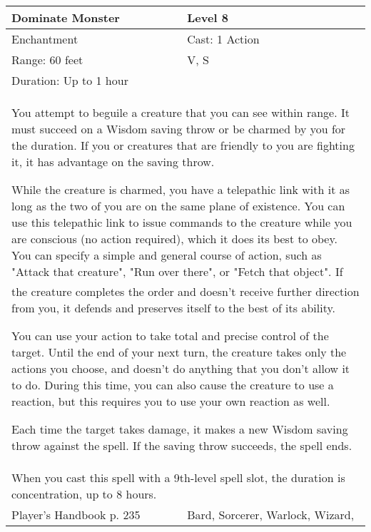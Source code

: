 \documentclass[11pt]{report}
\begin{document}
\begin{table}[H]
	\begin{tabular}{||p{6cm}|p{6cm}||}
		\hline\hline
		\bf{Dominate Monster} & Level 8\\ \hline
		Enchantment & Cast: 1 Action\\ \hline
		Range: 60 feet & V, S\\ \hline
		Duration: Up to 1 hour & \\ \hline
		\multicolumn{2}{||p{12cm}||}{You attempt to beguile a creature that you can see within range. 
It must succeed on a Wisdom saving throw or be charmed by you for the duration. If you or creatures that are friendly to you are fighting it, it has advantage on the saving throw. 

While the creature is charmed, you have a telepathic link with it as long as the two of you are on the same plane of existence. You can use this telepathic link to issue commands to the creature while you are conscious (no action required), which it does its best to obey. You can specify a simple and general course of action, such as "Attack that creature", "Run over there", or "Fetch that object". If the creature completes the order and doesn’t receive further direction from you, it defends and preserves itself to the best of its ability. 

You can use your action to take total and precise control of the target. Until the end of your next turn, the creature takes only the actions you choose, and doesn’t do anything that you don’t allow it to do. During this time, you can also cause the creature to use a reaction, but this requires you to use your own reaction as well. 

Each time the target takes damage, it makes a new Wisdom saving throw against the spell. If the saving throw succeeds, the spell ends.}\\ \hline
		\multicolumn{2}{||p{12cm}||}{When you cast this spell with a 9th-level spell slot, the duration is concentration, up to 8 hours.}\\ \hline
Player's Handbook p. 235 & Bard, Sorcerer, Warlock, Wizard, \\ \hline\hline
	\end{tabular}
\end{table}
\end{document}
